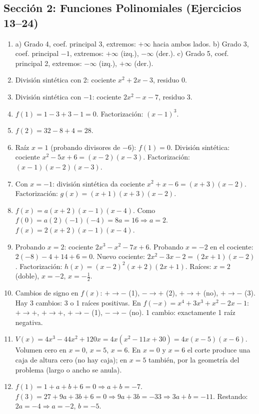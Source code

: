 \documentclass[12pt, letterpaper]{article}
\begin{document}
\subsection*{Sección 2: Funciones Polinomiales (Ejercicios 13--24)}

\begin{enumerate}[resume=respuestas, leftmargin=*, label=\textbf{\arabic*.}]
  \item a) Grado 4, coef. principal 3, extremos: $+\infty$ hacia ambos lados.
        \quad b) Grado 3, coef. principal $-1$, extremos: $+\infty$ (izq.), $-\infty$ (der.).
        \quad c) Grado 5, coef. principal 2, extremos: $-\infty$ (izq.), $+\infty$ (der.).

  \item División sintética con 2: cociente $x^2 + 2x - 3$, residuo 0.

  \item División sintética con $-1$: cociente $2x^2 - x - 7$, residuo 3.

  \item $f(1) = 1 - 3 + 3 - 1 = 0$. Factorización: $(x - 1)^3$.

  \item $f(2) = 32 - 8 + 4 = 28$.

  \item Raíz $x = 1$ (probando divisores de $-6$): $f(1) = 0$. División sintética: cociente $x^2 - 5x + 6 = (x - 2)(x - 3)$. Factorización: $(x - 1)(x - 2)(x - 3)$.

  \item Con $x = -1$: división sintética da cociente $x^2 + x - 6 = (x + 3)(x - 2)$. Factorización: $g(x) = (x + 1)(x + 3)(x - 2)$.

  \item $f(x) = a(x + 2)(x - 1)(x - 4)$. Como $f(0) = a(2)(-1)(-4) = 8a = 16 \Rightarrow a = 2$. $f(x) = 2(x + 2)(x - 1)(x - 4)$.

  \item Probando $x = 2$: cociente $2x^3 - x^2 - 7x + 6$. Probando $x = -2$ en el cociente: $2(-8) - 4 + 14 + 6 = 0$. Nuevo cociente: $2x^2 - 3x - 2 = (2x + 1)(x - 2)$. Factorización: $h(x) = (x - 2)^2 (x + 2)(2x + 1)$. Raíces: $x = 2$ (doble), $x = -2$, $x = -\frac{1}{2}$.

  \item Cambios de signo en $f(x)$: $+ \to -$ (1), $- \to +$ (2), $+ \to +$ (no), $+ \to -$ (3). Hay 3 cambios: 3 o 1 raíces positivas. En $f(-x) = x^4 + 3x^3 + x^2 - 2x - 1$: $+ \to +$, $+ \to +$, $+ \to -$ (1), $- \to -$ (no). 1 cambio: exactamente 1 raíz negativa.

  \item $V(x) = 4x^3 - 44x^2 + 120x = 4x(x^2 - 11x + 30) = 4x(x - 5)(x - 6)$. Volumen cero en $x = 0$, $x = 5$, $x = 6$. En $x = 0$ y $x = 6$ el corte produce una caja de altura cero (no hay caja); en $x = 5$ también, por la geometría del problema (largo o ancho se anula).

  \item $f(1) = 1 + a + b + 6 = 0 \Rightarrow a + b = -7$. $f(3) = 27 + 9a + 3b + 6 = 0 \Rightarrow 9a + 3b = -33 \Rightarrow 3a + b = -11$. Restando: $2a = -4 \Rightarrow a = -2$, $b = -5$.
\end{enumerate}
\end{document}
